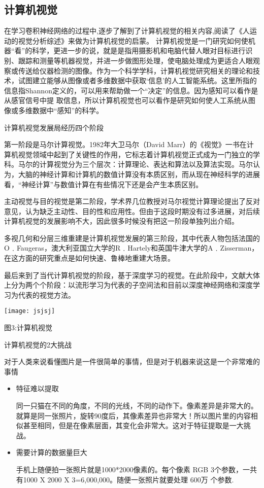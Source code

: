 \documentclass{article}
\begin{document}
\subsection{计算机视觉}
在学习卷积神经网络的过程中,逐步了解到了计算机视觉的相关内容,阅读了《人运动的视觉分析综述》\citep{jsjsj}来做为计算机视觉的启蒙。
计算机视觉是一门研究如何使机器“看”的科学，更进一步的说，就是是指用摄影机和电脑代替人眼对目标进行识别、跟踪和测量等机器视觉，并进一步做图形处理，使电脑处理成为更适合人眼观察或传送给仪器检测的图像。作为一个科学学科，计算机视觉研究相关的理论和技术，试图建立能够从图像或者多维数据中获取‘信息’的人工智能系统。这里所指的信息指Shannon定义的，可以用来帮助做一个“决定”的信息。因为感知可以看作是从感官信号中提 取信息，所以计算机视觉也可以看作是研究如何使人工系统从图像或多维数据中“感知”的科学。

计算机视觉发展局经历四个阶段



第一阶段是马尔计算视觉。1982年大卫马尔（David Marr）的《视觉》\citep{sj}一书在计算机视觉领域中起到了关键性的作用，它标志着计算机视觉正式成为一门独立的学科。马尔的计算视觉分为三个层次：计算理论、表达和算法以及算法实现。马尔认为，大脑的神经计算和计算机的数值计算没有本质区别，而从现在神经科学的进展看，“神经计算”与数值计算在有些情况下还是会产生本质区别。



主动视觉与目的视觉是第二阶段，学术界几位教授对马尔视觉计算理论提出了反对意见，认为缺乏主动性、目的性和应用性。但由于这段时期没有过多进展，对后续计算机视觉的发展影响不大，因此很多时候没有把这一阶段单独列出介绍。



多视几何和分层三维重建是计算机视觉发展的第三阶段，其中代表人物包括法国的O﹒Faugeras，澳大利亚国立大学的R﹒Hartely和英国牛津大学的A﹒Zisserman，在这方面的研究重点是如何快速、鲁棒地重建大场景。



最后来到了当代计算机视觉的阶段，基于深度学习的视觉。在此阶段中，文献大体上分为两个个阶段：以流形学习为代表的子空间法和目前以深度神经网络和深度学习为代表的视觉方法。

\begin{center}
\texttt{[image: jsjsj]}
\caption{图3:计算机视觉}
\end{center}

计算机视觉的2大挑战\par
对于人类来说看懂图片是一件很简单的事情，但是对于机器来说这是一个非常难的事情\par
\begin{itemize}
    \item 特征难以提取
    
    同一只猫在不同的角度，不同的光线，不同的动作下。像素差异是非常大的。就算是同一张照片，旋转90度后，其像素差异也非常大！所以图片里的内容相似甚至相同，但是在像素层面，其变化会非常大。这对于特征提取是一大挑战。
    
    \item 需要计算的数据量巨大
    
    手机上随便拍一张照片就是1000*2000像素的。每个像素 RGB 3个参数，一共有1000 X 2000 X 3=6,000,000。随便一张照片就要处理 600万 个参数.
    
\end{itemize}
\end{document}
